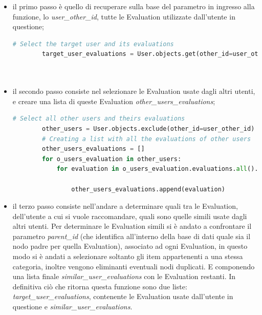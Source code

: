 \begin{itemize}
    \item il primo passo è quello di recuperare sulla base del parametro in ingresso alla funzione, lo \textit{user\_other\_id}, 
    tutte le Evaluation utilizzate dall'utente in questione;
    \begin{lstlisting}[language=Python, label=lst:UB_CF_2]
        # Select the target user and its evaluations
        target_user_evaluations = User.objects.get(other_id=user_other_id).evaluations.all()\
                                                                          .values('other_id', 'parent_id')\
                                                                          .order_by('other_id')
    \end{lstlisting}
    \item il secondo passo consiste nel selezionare le Evaluation usate dagli altri utenti, e creare una lista di queste Evaluation 
    \textit{other\_users\_evaluations};
    \begin{lstlisting}[language=Python, label=lst:UB_CF_3]
        # Select all other users and theirs evaluations
        other_users = User.objects.exclude(other_id=user_other_id)
        # Creating a list with all the evaluations of other users
        other_users_evaluations = []
        for o_users_evaluation in other_users:
            for evaluation in o_users_evaluation.evaluations.all().values('other_id', 'id', 'parent_id')\
                                                                    .order_by('other_id'):
                other_users_evaluations.append(evaluation)
    \end{lstlisting}
    \item il terzo passo consiste nell'andare a determinare quali tra le Evaluation, dell'utente a cui si vuole raccomandare, quali sono quelle 
    simili usate dagli altri utenti. Per determinare le Evaluation simili si è andato a confrontare il parametro \textit{parent\_id} (che identifica 
    all'interno della base di dati quale sia il nodo padre per quella Evaluation), associato ad ogni Evaluation, in questo modo si è andati a selezionare 
    soltanto gli item appartenenti a una stessa categoria, inoltre vengono eliminanti eventuali nodi duplicati. E componendo una lista finale 
    \textit{similar\_user\_evaluations} con le Evaluation restanti.
    In definitiva ciò che ritorna questa funzione sono due liste: \textit{target\_user\_evaluations}, contenente le Evaluation usate dall'utente 
    in questione e \textit{similar\_user\_evaluations}.

\end{itemize}
